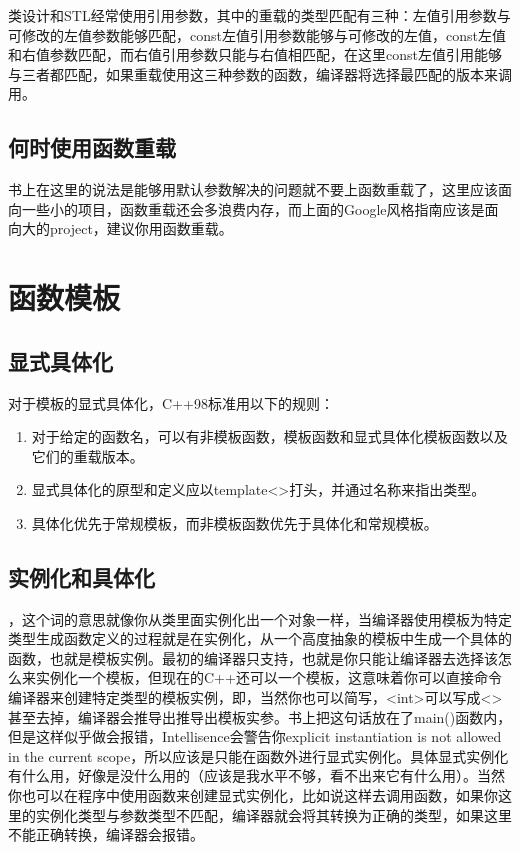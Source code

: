 类设计和STL经常使用引用参数，其中的重载的类型匹配有三种：左值引用参数与可修改的左值参数能够匹配，const左值引用参数能够与可修改的左值，const左值和右值参数匹配，而右值引用参数只能与右值相匹配，在这里const左值引用能够与三者都匹配，如果重载使用这三种参数的函数，编译器将选择最匹配的版本来调用。

\subsection{何时使用函数重载}

书上在这里的说法是能够用默认参数解决的问题就不要上函数重载了，这里应该面向一些小的项目，函数重载还会多浪费内存，而上面的Google风格指南应该是面向大的project，建议你用函数重载。

\section{函数模板}

\addtocounter{subsection}{2}

\subsection{显式具体化}

对于模板的显式具体化，C++98标准用以下的规则：

\begin{enumerate}
\item 对于给定的函数名，可以有非模板函数，模板函数和显式具体化模板函数以及它们的重载版本。
\item 显式具体化的原型和定义应以template<>打头，并通过名称来指出类型。
\item 具体化优先于常规模板，而非模板函数优先于具体化和常规模板。
\end{enumerate}

\subsection{实例化和具体化}

，这个词的意思就像你从类里面实例化出一个对象一样，当编译器使用模板为特定类型生成函数定义的过程就是在实例化，从一个高度抽象的模板中生成一个具体的函数，也就是模板实例。最初的编译器只支持，也就是你只能让编译器去选择该怎么来实例化一个模板，但现在的C++还可以一个模板，这意味着你可以直接命令编译器来创建特定类型的模板实例，即，当然你也可以简写，<int>可以写成<>甚至去掉，编译器会推导出推导出模板实参。书上把这句话放在了main()函数内，但是这样似乎做会报错，Intellisence会警告你explicit instantiation is not allowed in the current scope，所以应该是只能在函数外进行显式实例化。具体显式实例化有什么用，好像是没什么用的（应该是我水平不够，看不出来它有什么用）。当然你也可以在程序中使用函数来创建显式实例化，比如说这样去调用函数，如果你这里的实例化类型与参数类型不匹配，编译器就会将其转换为正确的类型，如果这里不能正确转换，编译器会报错。

